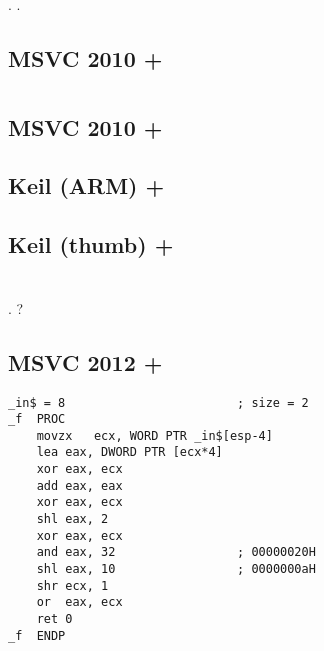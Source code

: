 .
.

\subsection{MSVC 2010 + \Ox}



\section{}

\subsection{MSVC 2010 + \Ox}



\subsection{Keil (ARM) + \Othree}



\subsection{Keil (thumb) + \Othree}




\section{}

.
?

\subsection{MSVC 2012 + \Ox}

\begin{lstlisting}
_in$ = 8						; size = 2
_f	PROC
	movzx	ecx, WORD PTR _in$[esp-4]
	lea	eax, DWORD PTR [ecx*4]
	xor	eax, ecx
	add	eax, eax
	xor	eax, ecx
	shl	eax, 2
	xor	eax, ecx
	and	eax, 32					; 00000020H
	shl	eax, 10					; 0000000aH
	shr	ecx, 1
	or	eax, ecx
	ret	0
_f	ENDP
\end{lstlisting}

